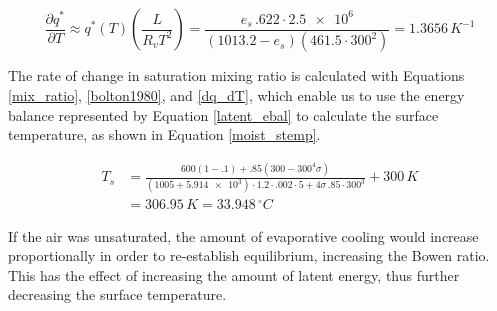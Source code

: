 \documentclass[12pt]{article}
\begin{document}
\begin{equation}\label{q6_mr}
    \frac{\partial q^*}{\partial T} \approx q^*(T) \left(\frac{L}{R_vT^2}\right) = \frac{e_s\,.622\cdot\num{2.5e6}}{(1013.2-e_s)(461.5\cdot300^2)} = 1.3656\,\si{K^{-1}}
\end{equation}

The rate of change in saturation mixing ratio is calculated with Equations \ref{mix_ratio}, \ref{bolton1980}, and \ref{dq_dT}, which enable us to use the energy balance represented by Equation \ref{latent_ebal} to calculate the surface temperature, as shown in Equation \ref{moist_stemp}.

\begin{equation}\label{moist_stemp}
    \begin{split}
        T_s &= \frac{600(1-.1)+.85(300-300^4\sigma)}{(1005+\num{5.914e3})\cdot1.2\cdot.002\cdot 5 + 4\sigma\,.85\cdot300^3} + 300\,\si{K} \\
        &= 306.95\,\si{K} = 33.948\,^\circ\si{C}
    \end{split}
\end{equation}

If the air was unsaturated, the amount of evaporative cooling would increase proportionally in order to re-establish equilibrium, increasing the Bowen ratio. This has the effect of increasing the amount of latent energy, thus further decreasing the surface temperature.
\end{document}

